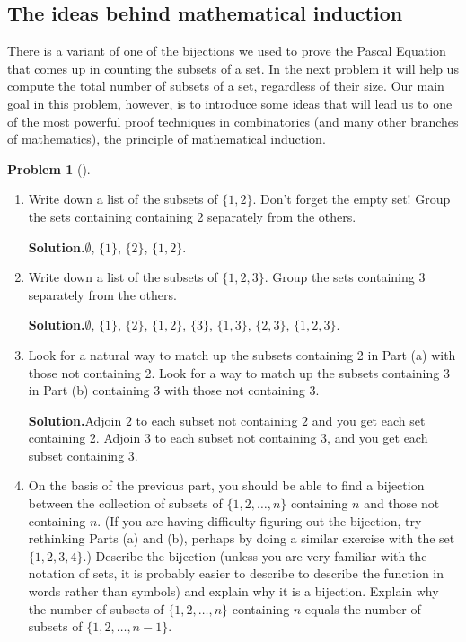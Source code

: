 \documentclass[10pt,]{book}
\theoremstyle{plain}
\theoremstyle{definition}
\newtheorem{activity}[project]{Problem}
\theoremstyle{definition}
\numberwithin{equation}{chapter}
\begin{document}
\subsection[{The ideas behind mathematical induction}]{The ideas behind mathematical induction}\label{subsection-65}
There is a variant of one of the bijections we used to prove the Pascal Equation that comes up in counting the subsets of a set. In the next problem it will help us compute the total number of subsets of a set, regardless of their size. Our main goal in this problem, however, is to introduce some ideas that will lead us to one of the most powerful proof techniques in combinatorics (and many other branches of mathematics), the principle of mathematical induction.%
\begin{activity}[]\label{subsetsbysmallestcounterexample}
\leavevmode%
\begin{enumerate}[font=\bfseries,label=(\alph*),ref=\alph*]
\item\label{task-250} Write down a list of the subsets of \(\{1, 2 \}\). Don't forget the empty set! Group the sets containing containing 2 separately from the others.%
\par\medskip\noindent%
\textbf{Solution.}\quad \(\emptyset\), \(\{1\}\), \(\{2\}\), \(\{1, 2\}\).%
\item\label{task-251} Write down a list of the subsets of \(\{1, 2, 3 \}\). Group the sets containing 3 separately from the others.%
\par\medskip\noindent%
\textbf{Solution.}\quad \(\emptyset\), \(\{1\}\), \(\{2\}\), \(\{1, 2\}\), \(\{3\}\), \(\{1,3\}\), \(\{2,3\}\), \(\{1,2,3\}\).%
\item\label{task-252} Look for a natural way to match up the subsets containing 2 in Part (a) with those not containing 2. Look for a way to match up the subsets containing 3 in Part (b) containing 3 with those not containing 3.%
\par\medskip\noindent%
\textbf{Solution.}\quad Adjoin \(2\) to each subset not containing \(2\) and you get each set containing 2. Adjoin 3 to each subset not containing 3, and you get each subset containing 3.%
\item\label{task-253} On the basis of the previous part, you should be able to find a bijection between the collection of subsets of \(\{1, 2, \ldots , n \}\) containing \(n\) and those not containing \(n\). (If you are having difficulty figuring out the bijection, try rethinking Parts (a) and (b), perhaps by doing a similar exercise with the set \(\{1,2,3,4\}\).) Describe the bijection (unless you are very familiar with the notation of sets, it is probably easier to describe to describe the function in words rather than symbols) and explain why it is a bijection. Explain why the number of subsets of \(\{1, 2, \ldots , n \}\) containing \(n\) equals the number of subsets of \(\{1, 2, \ldots, n-1 \}\).%

\end{enumerate}
\end{activity}
\end{document}
